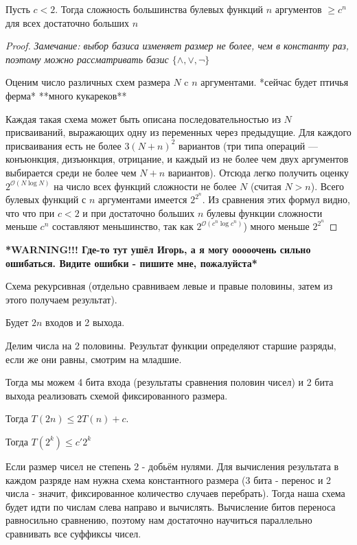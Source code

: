 \begin{theorem} \thmslashn

	Пусть $c < 2$. Тогда сложность большинства булевых функций $n$ аргументов $\geq c^n$ для всех достаточно больших $n$
	\begin{proof} \thmslashn
	
		\textit{Замечание: выбор базиса изменяет размер не более, чем в константу раз, поэтому можно рассматривать базис $\{\land, \lor, \neg\}$}
		
		Оценим число различных схем размера $N$ c $n$ аргументами. *сейчас будет птичья ферма* **много кукареков** 
		
		Каждая такая схема может быть описана последовательностью из $N$ присваиваний, 
		выражающих одну из переменных через предыдущие. 
		Для каждого присваивания есть не более $3(N + n)^2$ вариантов
		(три типа операций — конъюнкция, дизъюнкция, отрицание, 
		и каждый из не более чем двух аргументов выбирается среди не более чем $N + n$ вариантов). 
		Отсюда легко получить оценку $2^{\mathcal{O}(N\log N)}$ на число всех функций сложности не более $N$ (считая $N > n$).
		Всего булевых функций с $n$ аргументами имеется $2^{2^n}$. 
		Из сравнения этих формул видно, что что при $c < 2$ и при достаточно больших $n$ булевы функции сложности меньше $c^n$ 
		составляют меньшинство, так как $2^{\mathcal{O}(c^n\log c^n)}$) много меньше $2^{2^n}$
	\end{proof}
\end{theorem}
\textbf{*WARNING!!! Где-то тут ушёл Игорь, а я могу ооооочень сильно ошибаться. Видите ошибки - пишите мне, пожалуйста*}

Схема рекурсивная (отдельно сравниваем левые и правые половины, затем из этого получаем результат).

Будет $2n$ входов и 2 выхода. 

Делим числа на 2 половины. 
Результат функции определяют старшие разряды, если же они равны, смотрим на младшие.

Тогда мы можем 4 бита входа (результаты сравнения половин чисел) и 2 бита выхода реализовать схемой фиксированного размера.

Тогда $T(2n) \leq 2T(n) + c$. 

Тогда $T(2^k) \leq c'2^k$

Если размер чисел не степень 2 - добьём нулями.
Для вычисления результата в каждом разряде нам нужна схема константного размера (3 бита - перенос и 2 числа - значит, фиксированное количество случаев перебрать).
Тогда наша схема будет идти по числам слева направо и вычислять.
Вычисление битов переноса равносильно сравнению, поэтому нам достаточно научиться параллельно сравнивать все суффиксы чисел.

